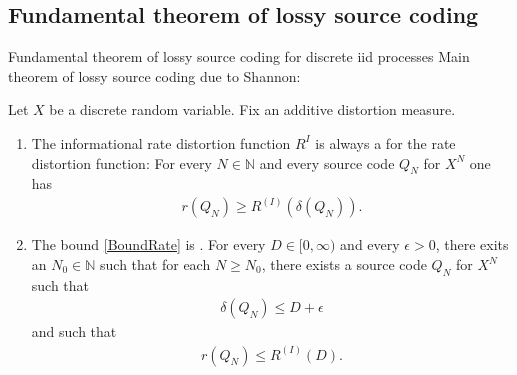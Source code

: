 \subsection{Fundamental theorem of lossy source coding}
\begin{frame}{Fundamental theorem of lossy source coding for discrete iid processes}
Main theorem of lossy source coding due to Shannon: 
\begin{theorem}
Let $X$ be a discrete random variable. Fix an additive distortion measure. 
\begin{enumerate}
\item The informational rate distortion function $R^{I}$ is always a  for the rate distortion function: 
For every $N\in\mathbb{N}$ and every source code $Q_N$ for $X^N$ one has
\begin{align}\label{BoundRate}
r(Q_N)\geq R^{(I)}(\delta(Q_N)). 
\end{align}
\item The bound \eqref{BoundRate} is . For every $D\in[0,\infty)$ and every $\epsilon>0$, there exits an $N_0\in\mathbb{N}$ such that for each $N\geq N_0$, there 
exists a source code $Q_N$ for $X^N$ such that 
\begin{align*}
\delta(Q_N)\leq D+\epsilon
\end{align*}
and such that
\begin{align*}
r(Q_{N})\leq R^{(I)}(D). 
\end{align*}
\end{enumerate}
\end{theorem}
\end{frame}

